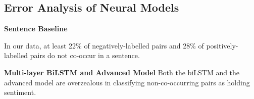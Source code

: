 \documentclass[11pt,a4paper]{article}
\begin{document}
\subsection{Error Analysis of Neural Models}
\noindent\textbf{Sentence Baseline}

In our data, at least 22\% of negatively-labelled pairs and 28\% of positively-labelled pairs do not co-occur in a sentence.

\noindent\textbf{Multi-layer BiLSTM and Advanced Model} %
Both the biLSTM and the advanced model are overzealous in classifying non-co-occurring pairs as holding sentiment. %
\end{document}
